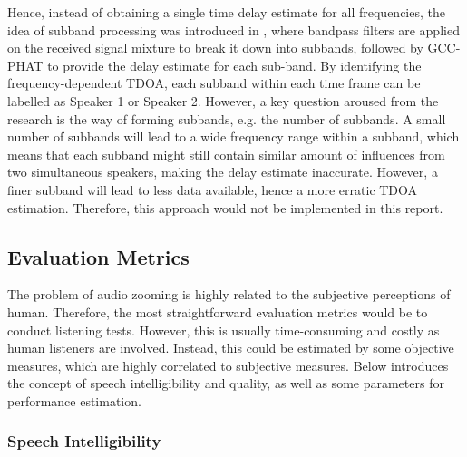 \documentclass[a4paper,twoside,12pt,hidelinks]{article}
\begin{document}
Hence, instead of obtaining a single time delay estimate for all frequencies, the idea of subband processing was introduced in \cite{Firoozabadi2014SubbandSpeakers}, where bandpass filters are applied on the received signal mixture to break it down into subbands, followed by GCC-PHAT to provide the delay estimate for each sub-band. By identifying the frequency-dependent TDOA, each subband within each time frame can be labelled as Speaker 1 or Speaker 2. However, a key question aroused from the research is the way of forming subbands, e.g. the number of subbands. A small number of subbands will lead to a wide frequency range within a subband, which means that each subband might still contain similar amount of influences from two simultaneous speakers, making the delay estimate inaccurate. However, a finer subband will lead to less data available, hence a more erratic TDOA estimation. Therefore, this approach would not be implemented in this report.

\subsection{Evaluation Metrics}
\label{sect:evaltec}
The problem of audio zooming is highly related to the subjective perceptions of human. Therefore, the most straightforward evaluation metrics would be to conduct listening tests. However, this is usually time-consuming and costly as human listeners are involved. Instead, this could be estimated by some objective measures, which are highly correlated to subjective measures. Below introduces the concept of speech intelligibility and quality, as well as some parameters for performance estimation.

\subsubsection{Speech Intelligibility}
\end{document}
